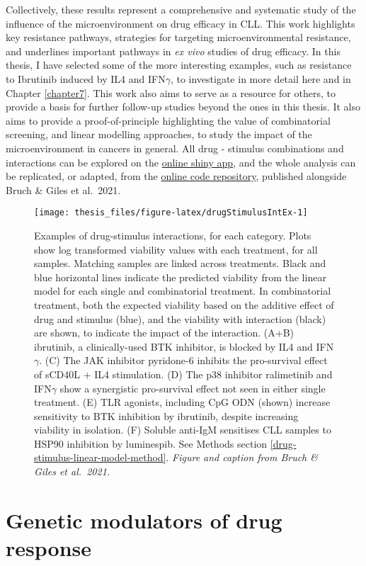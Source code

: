 \documentclass[11pt, a4paper, twosided]{book}
\begin{document}
Collectively, these results represent a comprehensive and systematic study of the influence of the microenvironment on drug efficacy in CLL. This work highlights key resistance pathways, strategies for targeting microenvironmental resistance, and underlines important pathways in \emph{ex vivo} studies of drug efficacy. In this thesis, I have selected some of the more interesting examples, such as resistance to Ibrutinib induced by IL4 and IFN\(\gamma\), to investigate in more detail here and in Chapter \ref{chapter7}. This work also aims to serve as a resource for others, to provide a basis for further follow-up studies beyond the ones in this thesis. It also aims to provide a proof-of-principle highlighting the value of combinatorial screening, and linear modelling approaches, to study the impact of the microenvironment in cancers in general. All drug - stimulus combinations and interactions can be explored on the \href{https://www.imbi.uni-heidelberg.de/dietrichlab/CLL_Microenvironment/}{online shiny app}, and the whole analysis can be replicated, or adapted, from the \href{https://github.com/Huber-group-EMBL/CLLCytokineScreen2021}{online code repository}, published alongside Bruch \& Giles et al.~2021.


\begin{figure}

{\centering \texttt{[image: thesis\_files/figure-latex/drugStimulusIntEx-1]} 

}

\caption{Examples of drug-stimulus interactions, for each category. Plots show log transformed viability values with each treatment, for all samples. Matching samples are linked across treatments. Black and blue horizontal lines indicate the predicted viability from the linear model for each single and combinatorial treatment. In combinatorial treatment, both the expected viability based on the additive effect of drug and stimulus (blue), and the viability with interaction (black) are shown, to indicate the impact of the interaction. (A+B) ibrutinib, a clinically-used BTK inhibitor, is blocked by IL4 and IFN\(\gamma\). (C) The JAK inhibitor pyridone-6 inhibits the pro-survival effect of sCD40L + IL4 stimulation. (D) The p38 inhibitor ralimetinib and IFN\(\gamma\) show a synergistic pro-survival effect not seen in either single treatment. (E) TLR agonists, including CpG ODN (shown) increase sensitivity to BTK inhibition by ibrutinib, despite increasing viability in isolation. (F) Soluble anti-IgM sensitises CLL samples to HSP90 inhibition by luminespib. See Methods section \ref{drug-stimulus-linear-model-method}. \emph{Figure and caption from Bruch \& Giles et al.~2021.}}\label{fig:drugStimulusIntEx}
\end{figure}
\hypertarget{mapping-genetic-modulators}{%
\section{Genetic modulators of drug response}\label{mapping-genetic-modulators}}
\end{document}
